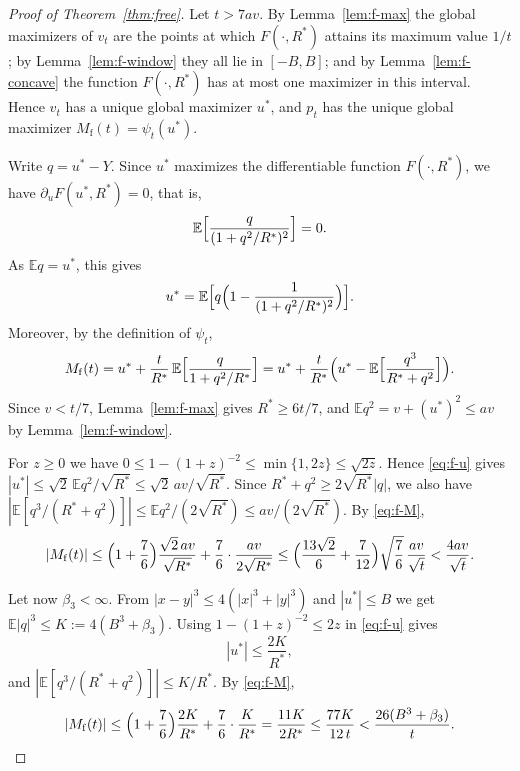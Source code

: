 \documentclass[11pt]{amsart}
\theoremstyle{definition}
\newcommand{\E}{\mathbb{E}}
\newcommand{\Mfr}{M_{\mathrm{f}}}
\begin{document}
\begin{proof}[Proof of Theorem~\ref{thm:free}]
Let $t>7av$. By Lemma~\ref{lem:f-max} the global maximizers of $v_t$ are the points at which $F(\cdot,R^*)$ attains
its maximum value $1/t$; by Lemma~\ref{lem:f-window} they all lie in $[-B,B]$; and by Lemma~\ref{lem:f-concave} the
function $F(\cdot,R^*)$ has at most one maximizer in this interval. Hence $v_t$ has a unique global maximizer $u^*$,
and $p_t$ has the unique global maximizer $\Mfr(t)=\psi_t(u^*)$.

Write $q=u^*-Y$. Since $u^*$ maximizes the differentiable function $F(\cdot,R^*)$, we have
$\partial_uF(u^*,R^*)=0$, that is,
\begin{equation}\label{eq:f-stat}
\E\Bigl[\frac{q}{(1+q^2/R^*)^2}\Bigr]=0 .
\end{equation}
As $\E q=u^*$, this gives
\begin{equation}\label{eq:f-u}
u^*=\E\Bigl[q\Bigl(1-\frac1{(1+q^2/R^*)^2}\Bigr)\Bigr].
\end{equation}
Moreover, by the definition of $\psi_t$,
\begin{equation}\label{eq:f-M}
\Mfr(t)=u^*+\frac{t}{R^*}\,\E\Bigl[\frac{q}{1+q^2/R^*}\Bigr]
=u^*+\frac{t}{R^*}\Bigl(u^*-\E\Bigl[\frac{q^3}{R^*+q^2}\Bigr]\Bigr).
\end{equation}
Since $v<t/7$, Lemma~\ref{lem:f-max} gives $R^*\ge6t/7$, and $\E q^2=v+(u^*)^2\le av$ by Lemma~\ref{lem:f-window}.

For $z\ge0$ we have $0\le1-(1+z)^{-2}\le\min\{1,2z\}\le\sqrt{2z}$. Hence \eqref{eq:f-u} gives
$|u^*|\le\sqrt2\,\E q^2/\sqrt{R^*}\le\sqrt2\,av/\sqrt{R^*}$. Since $R^*+q^2\ge2\sqrt{R^*}|q|$, we also have
$|\E[q^3/(R^*+q^2)]|\le\E q^2/(2\sqrt{R^*})\le av/(2\sqrt{R^*})$. By \eqref{eq:f-M},
\[
|\Mfr(t)|\le\Bigl(1+\frac76\Bigr)\frac{\sqrt2\,av}{\sqrt{R^*}}+\frac76\cdot\frac{av}{2\sqrt{R^*}}
\le\Bigl(\frac{13\sqrt2}{6}+\frac7{12}\Bigr)\sqrt{\frac76}\,\frac{av}{\sqrt t}<\frac{4av}{\sqrt t}.
\]

Let now $\beta_3<\infty$. From $|x-y|^3\le4(|x|^3+|y|^3)$ and $|u^*|\le B$ we get $\E|q|^3\le K:=4(B^3+\beta_3)$.
Using $1-(1+z)^{-2}\le2z$ in \eqref{eq:f-u} gives
\begin{equation}\label{eq:f-u3}
|u^*|\le\frac{2K}{R^*},
\end{equation}
and $|\E[q^3/(R^*+q^2)]|\le K/R^*$. By \eqref{eq:f-M},
\[
|\Mfr(t)|\le\Bigl(1+\frac76\Bigr)\frac{2K}{R^*}+\frac76\cdot\frac{K}{R^*}=\frac{11K}{2R^*}\le\frac{77K}{12\,t}
<\frac{26(B^3+\beta_3)}{t}.\qedhere
\]
\end{proof}
\end{document}
